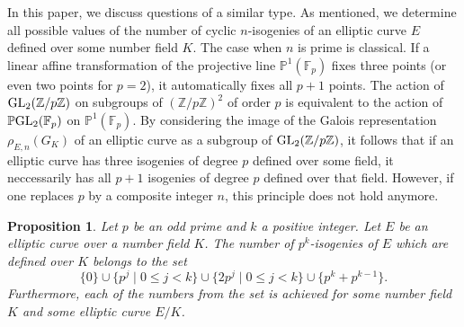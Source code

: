 \documentclass[10pt,leqno]{amsart}
\newcommand{\Z}{\mathbb{Z}}
\newcommand{\F}{\mathbb{F}}
\newcommand{\PP}{\mathbb{P}}
\newcommand{\GL}{\textnormal{GL}}
\newtheorem{proposition}[theorem]{Proposition}
\theoremstyle{definition}
\theoremstyle{remark}
\numberwithin{theorem}{section}
\begin{document}
In this paper, we discuss questions of a similar type. As mentioned, we determine all possible values of the number of cyclic $n$-isogenies of an elliptic curve $E$ defined over some number field $K$. The case when $n$ is prime is classical. If a linear affine transformation of the projective line $\PP^1(\F_p)$ fixes three points (or even two points for $p=2$), it automatically fixes all $p+1$ points. The action of $\GL_2(\Z/p\Z)$ on subgroups of $(\Z/p\Z)^2$ of order $p$ is equivalent to the action of $\PP\GL_2(\F_p)$ on $\PP^1(\F_p)$. By considering the image of the Galois representation $\rho_{E,n}(G_K)$ of an elliptic curve as a subgroup of $\GL_2(\Z/p\Z)$, it follows that if an elliptic curve has three isogenies of degree $p$ defined over some field, it neccessarily has all $p+1$ isogenies of degree $p$ defined over that field. However, if one replaces $p$ by a composite integer $n$, this principle does not hold anymore. 

\begin{proposition}
    Let $p$ be an odd prime and $k$ a positive integer. Let $E$ be an elliptic curve over a number field $K$. The number of $p^k$-isogenies of $E$ which are defined over $K$ belongs to the set $$\{0\} \cup \{p^j \mid 0\leq j <k\}\cup \{2p^j \mid 0\leq j <k\}\cup \{p^k+p^{k-1}\}.$$ Furthermore, each of the numbers from the set is achieved for some number field $K$ and some elliptic curve $E/K$.  
\end{proposition}
\end{document}
